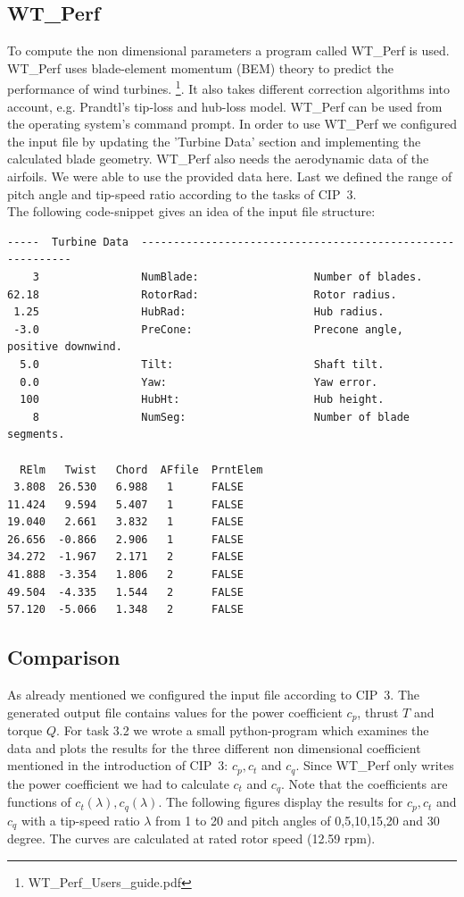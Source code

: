 \documentclass[10pt]{article}
\begin{document}
\subsection{WT\_Perf}
To compute the non dimensional parameters a program called WT\_Perf is used. 
WT\_Perf uses blade-element momentum (BEM) theory to predict the performance of wind turbines. \footnote{WT\_Perf\_Users\_guide.pdf}. It also takes different correction algorithms into account, e.g. Prandtl's tip-loss and hub-loss model.
WT\_Perf can be used from the operating system's command prompt. In order to use WT\_Perf  we configured the input file by updating the 'Turbine Data' section and implementing the calculated blade geometry. WT\_Perf also needs the aerodynamic data of the airfoils. We were able to use the provided data here. Last we defined the range of pitch angle and tip-speed ratio according to the tasks of CIP~3. \\
The following code-snippet gives an idea of the input file structure:
\newpage
\begin{lstlisting}
-----  Turbine Data  -----------------------------------------------------------
    3                NumBlade:                  Number of blades.
62.18                RotorRad:                  Rotor radius.
 1.25                HubRad:                    Hub radius. 
 -3.0                PreCone:                   Precone angle, positive downwind.
  5.0                Tilt:                      Shaft tilt.
  0.0                Yaw:                       Yaw error.
  100                HubHt:                     Hub height.
    8                NumSeg:                    Number of blade segments.

  RElm   Twist   Chord  AFfile  PrntElem
 3.808  26.530   6.988	 1	    FALSE
11.424	 9.594   5.407	 1      FALSE
19.040	 2.661   3.832	 1	    FALSE
26.656	-0.866	 2.906	 1	    FALSE
34.272	-1.967   2.171	 2	    FALSE
41.888	-3.354   1.806	 2	    FALSE
49.504	-4.335   1.544	 2	    FALSE
57.120	-5.066   1.348	 2	    FALSE
\end{lstlisting}

\subsection{Comparison}
As already mentioned we configured the input file according to CIP~3. The generated output file contains values for the power coefficient $c_p$, thrust $T$ and torque $Q$.
For task 3.2 we wrote a small python-program which examines the data and plots the results for the three different non dimensional coefficient mentioned in the introduction of CIP~3: $c_p, c_t$ and $c_q$. Since WT\_Perf only writes the power coefficient we had to calculate $c_t$ and $c_q$. Note that the coefficients are functions of $c_t(\lambda), c_q(\lambda)$.
The following figures display the results for $c_p, c_t$ and $c_q$ with a tip-speed ratio $\lambda$ from 1 to 20 and pitch angles of 0,5,10,15,20 and 30 degree. The curves are calculated at rated rotor speed (12.59 rpm).
\end{document}
